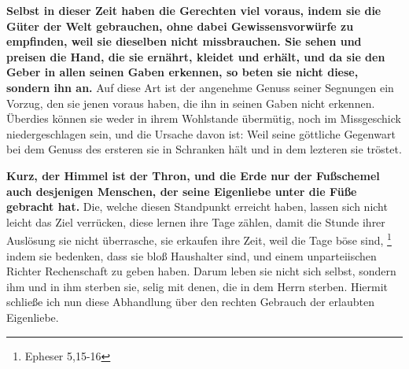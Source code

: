 \label{ref:04_23_dinge_der_welt}
\textbf{Selbst in dieser Zeit haben die Gerechten viel voraus, indem sie die
Güter der
Welt gebrauchen, ohne dabei Gewissensvorwürfe zu empfinden, weil sie dieselben
nicht missbrauchen. Sie sehen und preisen die Hand, die sie ernährt, kleidet und
erhält, und da sie den Geber in allen seinen Gaben erkennen, so beten sie nicht
diese, sondern ihn an.} Auf diese Art ist der angenehme Genuss seiner Segnungen
ein Vorzug, den sie jenen voraus haben, die ihn in seinen Gaben nicht
erkennen. Überdies können sie weder in ihrem Wohlstande übermütig, noch im
Missgeschick niedergeschlagen sein, und die Ursache davon ist: Weil seine
göttliche Gegenwart bei dem Genuss des ersteren sie in Schranken hält und in
dem lezteren sie tröstet.

\medskip

\textbf{Kurz, der Himmel ist der Thron, und die Erde nur der Fußschemel auch desjenigen
Menschen, der seine Eigenliebe unter die Füße gebracht hat.} Die, welche diesen
Standpunkt erreicht haben, lassen sich nicht leicht das Ziel verrücken, diese
lernen ihre Tage zählen, damit die Stunde ihrer Auslösung sie nicht überrasche,
sie erkaufen ihre Zeit, weil die Tage böse sind,
\footnote{Epheser 5,15-16}
indem
sie bedenken, dass sie bloß Haushalter sind, und einem unparteiischen Richter
Rechenschaft zu geben haben. Darum leben sie nicht sich selbst, sondern ihm und
in ihm sterben sie, selig mit denen, die in dem Herrn sterben. Hiermit schließe
ich nun diese Abhandlung über den rechten Gebrauch der erlaubten Eigenliebe.







